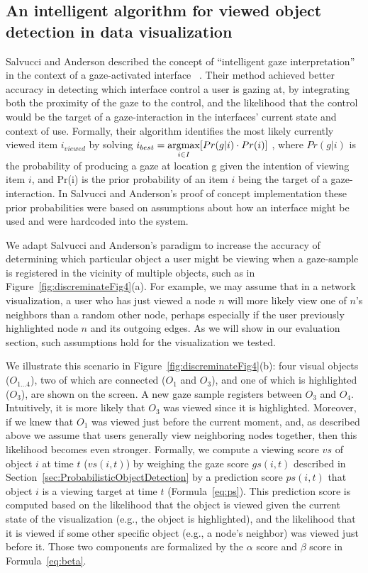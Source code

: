 \subsection{An intelligent algorithm for viewed object detection in data visualization}
\label{sec:MehthodsIntelligentAlgorithm}
Salvucci and Anderson described the concept of ``intelligent gaze interpretation'' in the context of a gaze-activated interface ~\cite{salvucci2000intelligent}. Their method achieved better accuracy in detecting which interface control a user is gazing at, by integrating both the proximity of the gaze to the control, and the likelihood that the control would be the target of a gaze-interaction in the interfaces’ current state and context of use. Formally, their algorithm identifies the most likely currently viewed item $i_{viewed}$ by solving $i_{best} = \displaystyle \operatorname*{argmax}_{i\in I}[Pr(g|i)\cdot Pr(i)]$ , where $Pr(g|i)$ is the probability of producing a gaze at location g given the intention of viewing item $i$, and Pr(i) is the prior probability of an item $i$  being the target of a gaze-interaction. In Salvucci and Anderson's proof of concept implementation these prior probabilities were based on assumptions about how an interface might be used and were hardcoded into the system.  

We adapt Salvucci and Anderson's paradigm to increase the accuracy of determining which particular object a user might be viewing when a gaze-sample is registered in the vicinity of multiple objects, such as in Figure~\ref{fig:discreminateFig4}(a). For example, we may assume that in a network visualization, a user who has just viewed a node $n$ will more likely view one of $n$'s neighbors than a random other node, perhaps especially if the user previously highlighted node $n$ and its outgoing edges.  As we will show in our evaluation section, such assumptions hold for the visualization we tested. 

We illustrate this scenario in Figure~\ref{fig:discreminateFig4}(b): four visual objects ($O_{1\ldots 4}$), two of which are connected ($O_1$ and $O_3$), and one of which is highlighted ($O_3$), are shown on the screen. A new gaze sample registers between $O_3$ and $O_4$. Intuitively, it is more likely that $O_3$ was viewed since it is highlighted. Moreover, if we knew that $O_1$ was viewed just before the current moment, and, as described above we assume that users generally view neighboring nodes together, then this likelihood becomes even stronger.  
Formally, we compute a viewing score $vs$ of object $i$ at time $t$ ($vs(i,t)$) by weighing the gaze score $gs(i,t)$ described in Section~\ref{sec:ProbabilisticObjectDetection} by a prediction score $ps(i,t)$ that object $i$ is a viewing target at time $t$ (Formula~\ref{eq:ps}). This prediction score is computed based on the likelihood that the object is viewed given the current state of the visualization (e.g., the object is highlighted), and the likelihood that it is viewed if some other specific object (e.g.,  a node's neighbor) was viewed just before it. Those two components are formalized by the  $\alpha$ score and $\beta$ score in Formula~\ref{eq:beta}.

